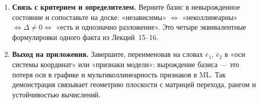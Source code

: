 \begin{enumerate}
  \item \textbf{Связь с критерием и определителем.} Верните базис в
    невырожденное состояние и сопоставьте на доске: «независимы»
    $\iff$ «неколлинеарны» $\iff \Delta\neq 0 \iff$ «есть и однозначно
    разложение». Это четыре эквивалентные формулировки одного факта из
    Лекций~15--16.

  \item \textbf{Выход на приложения.} Завершите, переименовав на словах
    $\bar{e}_1$, $\bar{e}_2$ в «оси системы координат» или «признаки
    модели»: вырождение базиса --- это потеря оси в графике и
    мультиколлинеарность признаков в ML. Так демонстрация связывает
    геометрию плоскости с матрицей перехода, рангом и устойчивостью
    вычислений.
\end{enumerate}
